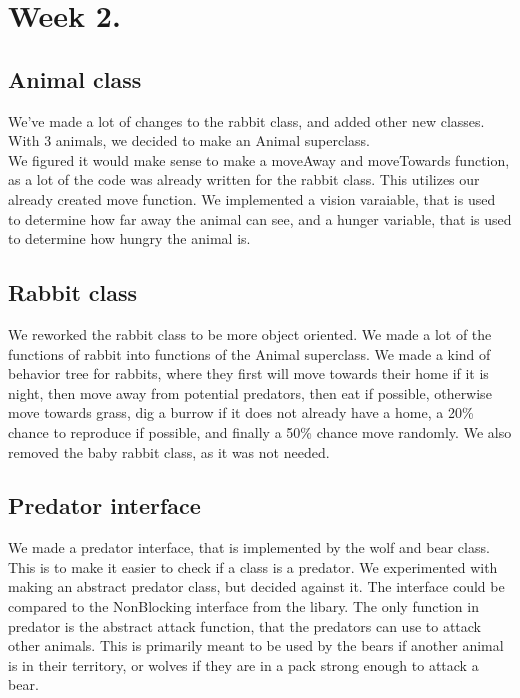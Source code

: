 \documentclass[11pt]{article}
\begin{document}
    \section*{Week 2.}
    \subsection*{Animal class}
    We've made a lot of changes to the rabbit class, and added other new classes. With 3 animals, we decided to make an Animal superclass.
    \\
    We figured it would make sense to make a moveAway and moveTowards function, as a lot of the code was already written for the rabbit class. 
    This utilizes our already created move function. We implemented a vision varaiable, that is used to determine how far away the animal can see, and a 
    hunger variable, that is used to determine how hungry the animal is.
    \subsection*{Rabbit class}
    We reworked the rabbit class to be more object oriented. We made a lot of the functions of rabbit into functions of the Animal superclass. 
    We made a kind of behavior tree for rabbits, where they first will move towards their home if it is night, then move away from potential predators,
    then eat if possible, otherwise move towards grass, dig a burrow if it does not already have a home, a 20\% chance to reproduce if possible, 
    and finally a 50\% chance move randomly. We also removed the baby rabbit class, as it was not needed.
    \subsection*{Predator interface}
    We made a predator interface, that is implemented by the wolf and bear class. This is to make it easier to check if a class is a predator. 
    We experimented with making an abstract predator class, but decided against it. The interface could be compared to the NonBlocking interface from the libary. 
    The only function in predator is the abstract attack function, that the predators can use to attack other animals. This is primarily meant to be used by 
    the bears if another animal is in their territory, or wolves if they are in a pack strong enough to attack a bear.
\end{document}
